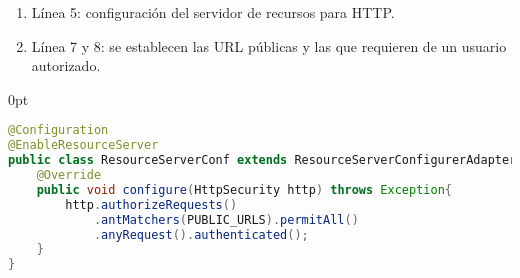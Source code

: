 \begin{enumerate}
\begin{enumerate}
		\item Línea 5: configuración del servidor de recursos para HTTP.
		\item Línea 7 y 8: se establecen las URL públicas y las que requieren de un usuario autorizado.
	\end{enumerate}
\begin{adjustwidth}{\listingfixwidth}{0pt}
\begin{lstlisting}[language=Java, caption={Clase de configuración de servidor de recursos.}, captionpos=b, label={lst:enable-resource-server}]
@Configuration
@EnableResourceServer
public class ResourceServerConf extends ResourceServerConfigurerAdapter{
	@Override
	public void configure(HttpSecurity http) throws Exception{
		http.authorizeRequests()
			.antMatchers(PUBLIC_URLS).permitAll()
			.anyRequest().authenticated();
	}
}
\end{lstlisting}
\end{adjustwidth}
\end{enumerate}
